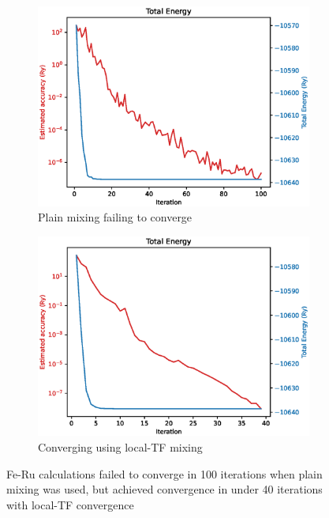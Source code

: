 \begin{figure}[htb]
\centering
\begin{subfigure}{.49\textwidth}
  \centering
  \includegraphics[width=.9\linewidth]{chapters/potentials_fe_pd_ru/convergence_failure/feru_1a_total_energy_0_plain.eps}
  \caption{Plain mixing failing to converge}
  \label{fig:feruplainmixing}
\end{subfigure}
\begin{subfigure}{.49\textwidth}
  \centering
  \includegraphics[width=.9\linewidth]{chapters/potentials_fe_pd_ru/convergence_failure/feru_1b_total_energy_0_local_tf.eps}
  \caption{Converging using local-TF mixing}
  \label{fig:ferulocaltfmixing}
\end{subfigure}
\caption{Fe-Ru calculations failed to converge in 100 iterations when plain mixing was used, but achieved convergence in under 40 iterations with local-TF convergence}
\label{fig:failuretoconverge}
\end{figure}

